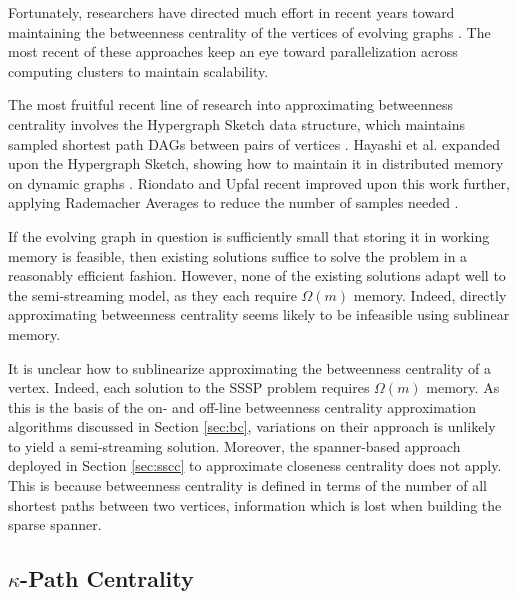\documentclass{report}
\newcommand{\algoname}[1]{\textnormal{\textsc{#1}}}
\begin{document}
Fortunately, researchers have directed much effort in recent years toward maintaining the betweenness centrality of the vertices of evolving graphs \cite{green2012fast, wei2014real, kourtellis2015scalable}. 
The most recent of these approaches keep an eye toward parallelization across computing clusters to maintain scalability.

The most fruitful recent line of research into approximating betweenness centrality involves the Hypergraph Sketch data structure,  which maintains sampled shortest path DAGs between pairs of vertices \cite{yoshida2014almost}. 
Hayashi et al. expanded upon the Hypergraph Sketch, showing how to maintain it in distributed memory on dynamic graphs \cite{hayashi2015fully}. 
Riondato and Upfal recent improved upon this work further, applying Rademacher Averages to reduce the number of samples needed \cite{riondato2018abra}.

If the evolving graph in question is sufficiently small that storing it in working memory is feasible, then existing solutions suffice to solve the problem in a reasonably efficient fashion. 
However, none of the existing solutions adapt well to the semi-streaming model, as they each require $\Omega(m)$ memory. 
Indeed, directly approximating betweenness centrality seems likely to be infeasible using sublinear memory.

It is unclear how to sublinearize approximating the betweenness centrality of a vertex.
Indeed, each solution to the \algoname{SSSP} problem requires $\Omega(m)$ memory.
As this is the basis of the on- and off-line  betweenness centrality approximation algorithms discussed in Section \ref{sec:bc}, variations on their approach is unlikely to yield a semi-streaming solution.
Moreover, the spanner-based approach deployed in Section \ref{sec:sscc} to approximate closeness centrality does not apply.
This is because betweenness centrality is defined in terms of the number of all shortest paths between two vertices, information which is lost when building the sparse spanner.



\subsection{$\kappa$-Path Centrality} 
\label{sec:kpc}
\end{document}
